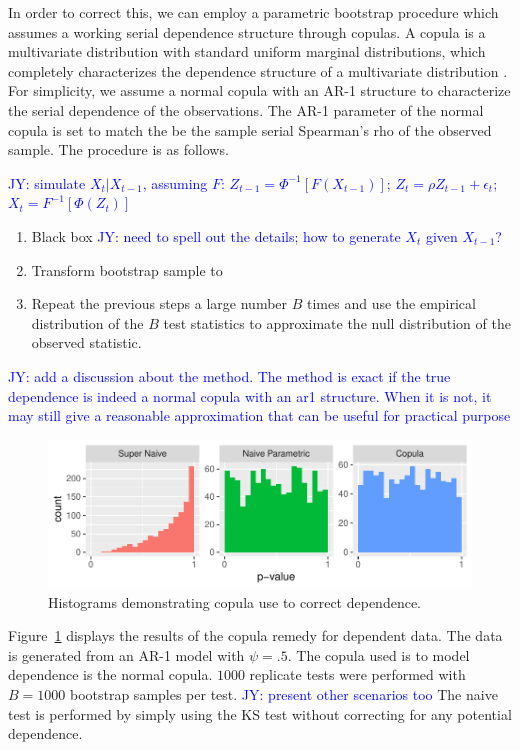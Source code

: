 \documentclass[12pt, letterpaper, titlepage]{article}
\newcommand{\jy}[1]{\textcolor{blue}{JY: #1}}
\begin{document}
In order to correct this, we can employ a parametric bootstrap procedure which
assumes a working serial dependence structure through copulas. A copula is a
multivariate distribution with standard uniform marginal distributions, which
completely characterizes the dependence structure of a multivariate
distribution \citep{Copula, Hofert}. For simplicity, we assume a normal copula 
with an AR-1 structure to characterize the serial dependence of the observations. 
The AR-1 parameter of the normal copula is set to match the be the sample serial
Spearman's rho of the observed sample. The procedure is as follows.


\jy{simulate $X_t | X_{t-1}$, assuming $F$:
  $Z_{t-1} = \Phi^{-1}[ F(X_{t-1})]$;
  $Z_{t} = \rho Z_{t -1} +  \epsilon_t$;
  $X_t = F^{-1} [ \Phi(Z_t) ]$
  }
  
\begin{enumerate}
  \item 
    Black box
    \jy{need to spell out the details; how to generate $X_t$ given $X_{t-1}$?}
  \item 
    Transform bootstrap sample to 
  \item
    Repeat the previous steps a large number $B$ times and use the empirical
    distribution of the $B$ test statistics to approximate
    the null distribution of the observed statistic. 
\end{enumerate}


\jy{add a discussion about the method. The method is exact if the true
  dependence is indeed a normal copula with an ar1 structure. When it is not, it
  may still give a reasonable approximation that can be useful for practical purpose}

\begin{figure}[tbp]
  \centering
  \includegraphics{hist_ar1_FD}
  \caption{Histograms demonstrating copula use to correct dependence.}
  \label{fig:hist_ar1_FD}
\end{figure}

Figure~\ref{fig:hist_ar1_FD} displays the results of the copula remedy for dependent data.
The data is generated from an AR-1 model with $\psi = .5$. The copula used is to model
dependence is the normal copula. $1000$ replicate tests were performed with
$B = 1000$ bootstrap samples per test.
\jy{present other scenarios too}
The naive test is performed by simply using the KS test without correcting for any 
potential dependence.
\end{document}
